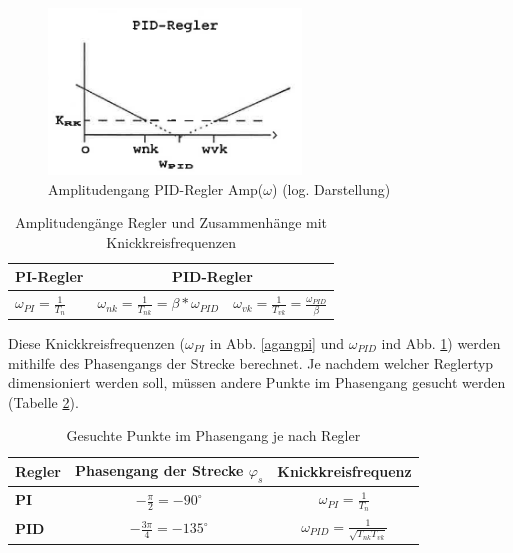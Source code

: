 \begin{figure}[h]
\centering
\includegraphics[width=0.6\textwidth]{agangpid.png}
\caption{Amplitudengang PID-Regler Amp($\omega$) (log. Darstellung) \cite{zellwegerpha}}
\label{agangpid}
\end{figure}

\begin{table}[h]
\centering
\renewcommand*{\arraystretch}{1.7}
\begin{tabular}{|l|l|c|}
\hline 
\textbf{PI-Regler} & \multicolumn{2}{c|}{\textbf{PID-Regler}} \\ 
\hline 
$\omega_{PI}=\frac{1}{T_n}$ & $\omega_{nk}=\frac{1}{T_{nk}}=\beta*\omega_{PID}$ & $\omega_{vk}=\frac{1}{T_{vk}}=\frac{\omega_{PID}}{\beta}$ \\ 
\hline 
\end{tabular}
\caption[Amplitudengänge / Knickkreisfrequenzen]{Amplitudengänge Regler und Zusammenhänge mit Knickkreisfrequenzen}
\label{amplitudengaenge}
\renewcommand*{\arraystretch}{1} 
\end{table}

\newpage
Diese Knickkreisfrequenzen ($\omega_{PI}$ in Abb. \ref{agangpi} und $\omega_{PID}$ ind Abb. \ref{agangpid}) werden mithilfe des Phasengangs der Strecke berechnet. Je nachdem welcher Reglertyp dimensioniert werden soll, müssen andere Punkte im Phasengang gesucht werden (Tabelle \ref{phgangpunkte}).\newline

\begin{table}[h]
\centering
\renewcommand*{\arraystretch}{1.7}
\begin{tabular}{|l|c|c|}
\hline 
\textbf{Regler} & \textbf{Phasengang der Strecke $\varphi_s$} & \textbf{Knickkreisfrequenz}  \\ 
\hline 
\textbf{PI} & $-\frac{\pi}{2}=-90^\circ$ & $\omega_{PI}=\frac{1}{T_n}$ \\ 
\hline 
\textbf{PID} & $-\frac{3\pi}{4}=-135^\circ$ & $\omega_{PID}=\frac{1}{\sqrt{T_{nk}T_{vk}}}$ \\ 
\hline 
\end{tabular}
\caption[Wichtige Phasengangpunkte]{Gesuchte Punkte im Phasengang je nach Regler}
\label{phgangpunkte}
\renewcommand*{\arraystretch}{1} 
\end{table}

